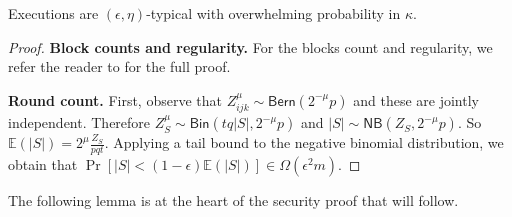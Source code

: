 \begin{theorem}[Typicality]\label{thm.typicality}
Executions are $(\epsilon, \eta)$-typical with overwhelming
probability in $\kappa$.
\end{theorem}
\begin{proof}

    \textbf{Block counts and regularity. }
    For the blocks count and regularity, we refer the reader to \cite{backbone}
    for the full proof.

    \textbf{Round count. }
    First, observe that $Z_{ijk}^\mu \sim \textsf{Bern}(2^{-\mu}p)$ and these
    are jointly independent. Therefore $Z_S^\mu \sim \textsf{Bin}(tq|S|,
    2^{-\mu}p)$ and $|S| \sim \textsf{NB}(Z_S, 2^{-\mu}p)$. So $\mathbb{E}(|S|) =
    2^\mu\frac{Z_S}{pqt}$. Applying a tail bound to the negative binomial
    distribution, we obtain that $\Pr[|S| < (1 - \epsilon)\mathbb{E}(|S|)] \in
    \Omega(\epsilon^2 m)$. \Qed
\end{proof}

The following lemma is at the heart of the security proof that will follow.


